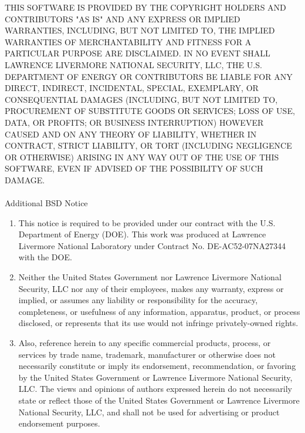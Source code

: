 THIS SOFTWARE IS PROVIDED BY THE COPYRIGHT HOLDERS AND CONTRIBUTORS 
"AS IS" AND ANY EXPRESS OR IMPLIED WARRANTIES, INCLUDING, BUT NOT 
LIMITED TO, THE IMPLIED WARRANTIES OF MERCHANTABILITY AND FITNESS 
FOR A PARTICULAR PURPOSE ARE DISCLAIMED. IN NO EVENT SHALL 
LAWRENCE LIVERMORE NATIONAL SECURITY, LLC, THE U.S. DEPARTMENT OF 
ENERGY OR CONTRIBUTORS BE LIABLE FOR ANY DIRECT, INDIRECT, INCIDENTAL, 
SPECIAL, EXEMPLARY, OR CONSEQUENTIAL DAMAGES (INCLUDING, BUT NOT LIMITED 
TO, PROCUREMENT OF SUBSTITUTE GOODS OR SERVICES; LOSS OF USE, 
DATA, OR PROFITS; OR BUSINESS INTERRUPTION) HOWEVER CAUSED AND ON ANY 
THEORY OF LIABILITY, WHETHER IN CONTRACT, STRICT LIABILITY, OR TORT 
(INCLUDING NEGLIGENCE OR OTHERWISE) ARISING IN ANY WAY OUT OF THE USE 
OF THIS SOFTWARE, EVEN IF ADVISED OF THE POSSIBILITY OF SUCH DAMAGE.
\\
\\
Additional BSD Notice
\begin{enumerate}
\item{} 
This notice is required to be provided under our contract with
the U.S. Department of Energy (DOE). This work was produced at
Lawrence Livermore National Laboratory under Contract 
No. DE-AC52-07NA27344 with the DOE.

\item{} 
Neither the United States Government nor Lawrence Livermore 
National Security, LLC nor any of their employees, makes any warranty, 
express or implied, or assumes any liability or responsibility for the
accuracy, completeness, or usefulness of any information, apparatus,
product, or process disclosed, or represents that its use would not
infringe privately-owned rights.

\item{} 
Also, reference herein to any specific commercial products, process, 
or services by trade name, trademark, manufacturer or otherwise does 
not necessarily constitute or imply its endorsement, recommendation, 
or favoring by the United States Government or Lawrence Livermore 
National Security, LLC. The views and opinions of authors expressed 
herein do not necessarily state or reflect those of the United States 
Government or Lawrence Livermore National Security, LLC, and shall 
not be used for advertising or product endorsement purposes.

\end{enumerate}
